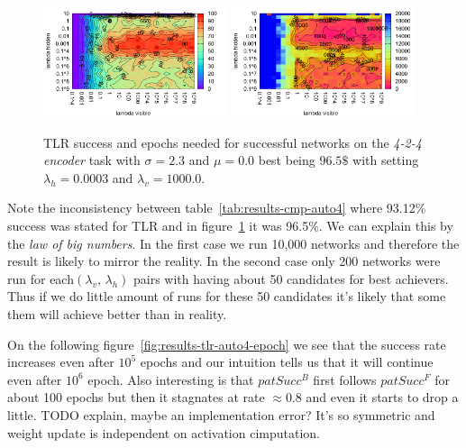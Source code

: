 \begin{figure}[H]
  \centering
  \includegraphics[width=0.48\textwidth]{img/tlr-auto4-success.pdf}   
  \includegraphics[width=0.48\textwidth]{img/tlr-auto4-epoch.pdf}     
  \caption{TLR success and epochs needed for successful networks on the \emph{4-2-4 encoder} task with $\sigma = 2.3$ and $\mu = 0.0$ best being $96.5\$$ with setting $\lambda_h=0.0003$ and $\lambda_v=1000.0$.}
  \label{fig:results-tlr-auto4-performance}
\end{figure}

Note the inconsistency between table~\ref{tab:results-cmp-auto4} where 93.12\% success was stated for TLR and in figure~\ref{fig:results-tlr-auto4-performance} it was 96.5\%. We can explain this by the \emph{law of big numbers}. In the first case we run 10,000 networks and therefore the result is likely to mirror the reality. In the second case only 200 networks were run for each$(\lambda_v,\,\lambda_h)$ pairs with having about 50 candidates for best achievers. Thus if we do little amount of runs for these 50 candidates it's likely that some them will achieve better than in reality. 

On the following figure~\ref{fig:results-tlr-auto4-epoch} we see that the success rate increases even after $10^5$ epochs and our intuition tells us that it will continue even after $10^6$ epoch. Also interesting is that $patSucc^B$ first follows $patSucc^F$ for about 100 epochs but then it stagnates at rate $\approx0.8$ and even it starts to drop a little. TODO explain, maybe an implementation error? It's so symmetric and weight update is independent on activation cimputation. 

